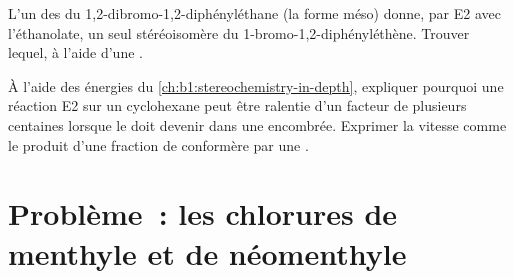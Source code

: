 \begin{exercise}[$\star\star\star$]\label{exo:b1:elimination:11}
L'un des  du 1,2-dibromo-1,2-diphényléthane (la forme
méso) donne, par E2 avec l'éthanolate, un seul stéréoisomère du
1-bromo-1,2-diphényléthène. Trouver lequel, à l'aide d'une .
\end{exercise}

\begin{exercise}[$\star\star\star$]\label{exo:b1:elimination:12}
À l'aide des énergies du \cref{ch:b1:stereochemistry-in-depth},
expliquer pourquoi une réaction E2 sur un cyclohexane peut être ralentie
d'un facteur de plusieurs centaines lorsque le  doit
devenir  dans une  encombrée. Exprimer la vitesse comme le
produit d'une fraction de conformère par une .
\end{exercise}

\section{Problème~: les chlorures de menthyle et de néomenthyle}

